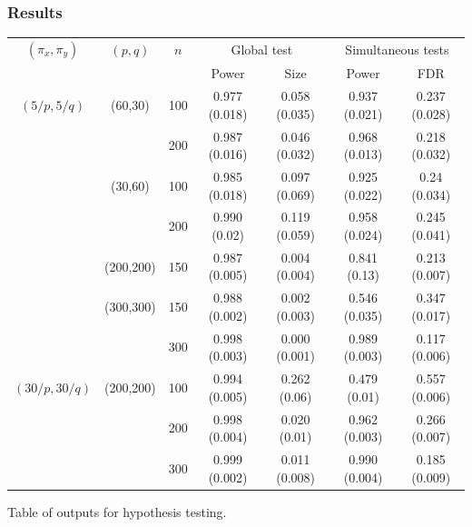 \documentclass[10pt]{beamer}
\theoremstyle{definition}
\begin{document}
\begin{frame}
\frametitle{Results}

\begin{scriptsize}
\begin{tabular}{ccccccc}
    \hline
$(\pi_x, \pi_y)$ & $(p,q)$   & $n$ & \multicolumn{2}{c}{Global test} & \multicolumn{2}{c}{Simultaneous tests}\\\cline{4-7}
 & & & Power     & Size			   & Power         & FDR           \\ \hline
    $(5/p, 5/q)$ & (60,30)   & 100 & 0.977 (0.018) & 0.058 (0.035) & 0.937 (0.021) & 0.237 (0.028) \\
    ~            & ~         & 200 & 0.987 (0.016) & 0.046 (0.032) & 0.968 (0.013) & 0.218 (0.032) \\
    ~            & (30,60)   & 100 & 0.985 (0.018) & 0.097 (0.069) & 0.925 (0.022) & 0.24 (0.034)  \\
    ~            & ~         & 200 & 0.990 (0.02)  & 0.119 (0.059) & 0.958 (0.024) & 0.245 (0.041) \\
    ~            & (200,200) & 150 & 0.987 (0.005) & 0.004 (0.004) & 0.841 (0.13)  & 0.213 (0.007) \\
    ~            & (300,300) & 150 & 0.988 (0.002) & 0.002 (0.003) & 0.546 (0.035) & 0.347 (0.017) \\
    ~            & ~         & 300 & 0.998 (0.003) & 0.000 (0.001) & 0.989 (0.003) & 0.117 (0.006) \\ \hline
  $(30/p, 30/q)$ & (200,200) & 100 & 0.994 (0.005) & 0.262 (0.06)  & 0.479 (0.01)  & 0.557 (0.006) \\
    ~            & ~         & 200 & 0.998 (0.004) & 0.020 (0.01)  & 0.962 (0.003) & 0.266 (0.007) \\
    ~            & ~         & 300 & 0.999 (0.002) & 0.011 (0.008) & 0.990 (0.004) & 0.185 (0.009) \\ \hline
\end{tabular}

\begin{center}
Table of outputs for hypothesis testing.
\end{center}
\end{scriptsize}
\end{frame}
\end{document}
